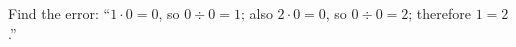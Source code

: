 Find the error: ``$1\cdot0=0$, so $0\div0=1$; also $2\cdot0=0$, so $0\div0=2$; therefore $1=2$.''\,
